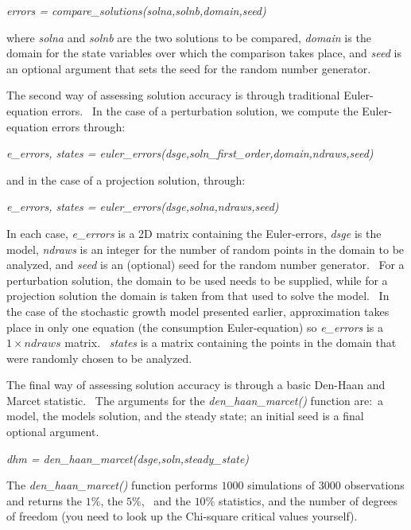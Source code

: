 \documentclass[notitlepage,11pt]{article}
\begin{document}
\bigskip

\textit{errors = compare\_solutions(solna,solnb,domain,seed)}

\bigskip

where \textit{solna} and \textit{solnb} are the two solutions to be
compared, \textit{domain} is the domain for the state variables over which
the comparison takes place, and \textit{seed} is an optional argument that
sets the seed for the random number generator.

The second way of assessing solution accuracy is through traditional
Euler-equation errors. \ In the case of a perturbation solution, we compute
the Euler-equation errors through:

\bigskip

\textit{e\_errors, states =
euler\_errors(dsge,soln\_first\_order,domain,ndraws,seed)}

\bigskip

and in the case of a projection solution, through:

\bigskip

\textit{e\_errors, states = euler\_errors(dsge,solna,ndraws,seed)}

\bigskip

In each case, \textit{e\_errors} is a 2D matrix containing the Euler-errors, 
\textit{dsge} is the model, \textit{ndraws} is an integer for the number of
random points in the domain to be analyzed, and \textit{seed} is an
(optional) seed for the random number generator. \ For a perturbation
solution, the domain to be used needs to be supplied, while for a projection
solution the domain is taken from that used to solve the model. \ In the
case of the stochastic growth model presented earlier, approximation takes
place in only one equation (the consumption Euler-equation) so \textit{%
e\_errors} is a $1\times ndraws$ matrix. \ \textit{states} is a matrix
containing the points in the domain that were randomly chosen to be analyzed.

The final way of assessing solution accuracy is through a basic Den-Haan and
Marcet statistic. \ The arguments for the \textit{den\_haan\_marcet()}
function are:\ a model, the models solution, and the steady state; an
initial seed is a final optional argument. 

\bigskip 

\textit{dhm = den\_haan\_marcet(dsge,soln,steady\_state)}

\bigskip 

The \textit{den\_haan\_marcet()} function performs $1000$ simulations of $%
3000$ observations and returns the $1$\%, the $5$\%, \ and the $10$\%
statistics, and the number of degrees of freedom (you need to look up the
Chi-square critical values yourself).
\end{document}

